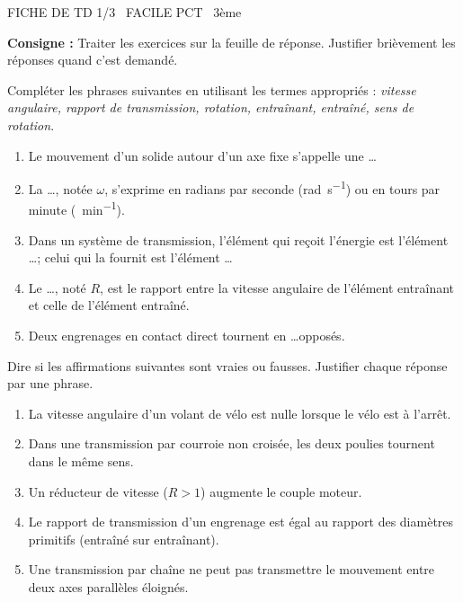 \documentclass[11pt]{article}
\begin{document}
\begin{tcolorbox}[enhanced,colback=popink,colframe=popink,arc=10pt,boxrule=0pt,left=12pt,right=12pt,top=9pt,bottom=9pt]
{\color{white}\popxbold\small FICHE DE TD 1/3 \textbullet\ FACILE \hfill PCT \textbullet\ 3ème\par}
\end{tcolorbox}
\vspace{4pt}
\noindent \textbf{Consigne :} Traiter les exercices sur la feuille de réponse. Justifier brièvement les réponses quand c'est demandé.

\begin{exercice}
Compléter les phrases suivantes en utilisant les termes appropriés : \textit{vitesse angulaire, rapport de transmission, rotation, entraînant, entraîné, sens de rotation}.
\begin{enumerate}
    \item Le mouvement d'un solide autour d'un axe fixe s'appelle une \ldots
    \item La \ldots, notée $\omega$, s'exprime en radians par seconde (\si{\radian\per\second}) ou en tours par minute (\si{\tr\per\minute}).
    \item Dans un système de transmission, l'élément qui reçoit l'énergie est l'élément \ldots ; celui qui la fournit est l'élément \ldots
    \item Le \ldots, noté $R$, est le rapport entre la vitesse angulaire de l'élément entraînant et celle de l'élément entraîné.
    \item Deux engrenages en contact direct tournent en \ldots opposés.
\end{enumerate}
\end{exercice}

\begin{exercice}
Dire si les affirmations suivantes sont vraies ou fausses. Justifier chaque réponse par une phrase.
\begin{enumerate}
    \item La vitesse angulaire d'un volant de vélo est nulle lorsque le vélo est à l'arrêt.
    \item Dans une transmission par courroie non croisée, les deux poulies tournent dans le même sens.
    \item Un réducteur de vitesse ($R > 1$) augmente le couple moteur.
    \item Le rapport de transmission d'un engrenage est égal au rapport des diamètres primitifs (entraîné sur entraînant).
    \item Une transmission par chaîne ne peut pas transmettre le mouvement entre deux axes parallèles éloignés.
\end{enumerate}
\end{exercice}
\end{document}
